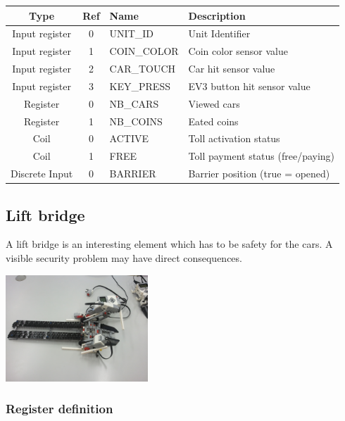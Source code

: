 \documentclass[10pt,a4paper]{article}
\begin{document}
			\begin{tabular}{|c|c|l|l|}
			\hline 
			\textbf{Type} & \textbf{Ref} & \textbf{Name} & \textbf{Description} \\ 
			\hline 
			Input register & 0 & UNIT\_ID & Unit Identifier\\ 
			\hline 
			Input register & 1 & COIN\_COLOR & Coin color sensor value\\ 
			\hline 
			Input register & 2 & CAR\_TOUCH & Car hit sensor value\\ 
			\hline 
			Input register & 3 & KEY\_PRESS & EV3 button hit sensor value\\ 
			\hline 
			Register & 0 & NB\_CARS & Viewed cars\\ 
			\hline 
			Register & 1 & NB\_COINS & Eated coins\\ 
			\hline 
			Coil & 0 & ACTIVE & Toll activation status \\ 
			\hline 
			Coil & 1 & FREE & Toll payment status (free/paying) \\ 
			\hline 
			Discrete Input & 0 & BARRIER & Barrier position (true = opened) \\ 
			\hline 
			\end{tabular} 
		
	\subsection{Lift bridge}
	A lift bridge is an interesting element which has to be safety for the cars. A visible security problem may have direct consequences.
	
	\begin{center}
	\includegraphics[height=4cm]{rsrc/Bridge_02.jpg}
	\end{center}
	
	    \subsubsection{Register definition}
	
\end{document}
